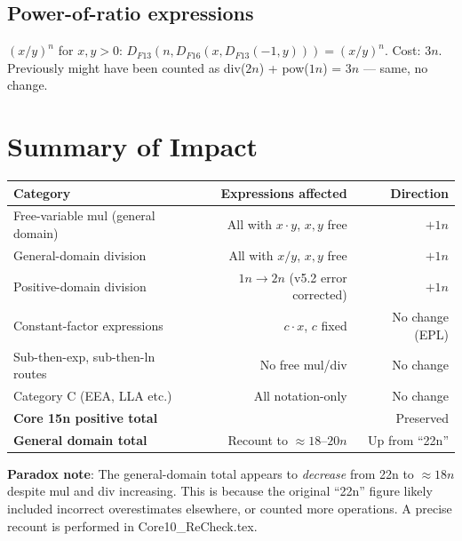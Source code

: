 \documentclass[11pt]{article}
\newcommand{\ok}[1]{\textcolor{correct}{#1}}
\newcommand{\bad}[1]{\textcolor{flagged}{#1}}
\begin{document}
\subsection{Power-of-ratio expressions}

$(x/y)^n$ for $x,y > 0$: $D_{F13}(n, D_{F16}(x, D_{F13}(-1,y))) = (x/y)^n$. Cost: $3n$.
Previously might have been counted as div($2n$) + pow($1n$) = $3n$ --- same, no change.

\section{Summary of Impact}

\begin{center}
\begin{tabular}{lrr}
\toprule
Category & Expressions affected & Direction \\
\midrule
Free-variable mul (general domain) & All with $x \cdot y$, $x,y$ free & $+1n$ \\
General-domain division & All with $x/y$, $x,y$ free & $+1n$ \\
Positive-domain division & $1n \to 2n$ (v5.2 error corrected) & $+1n$ \\
Constant-factor expressions & $c \cdot x$, $c$ fixed & No change (EPL) \\
Sub-then-exp, sub-then-ln routes & No free mul/div & No change \\
Category C (EEA, LLA etc.) & All notation-only & No change \\
\midrule
\textbf{Core 15n positive total} & & \ok{Preserved} \\
\textbf{General domain total} & Recount to $\approx 18$--$20n$ & \bad{Up from ``22n''} \\
\bottomrule
\end{tabular}
\end{center}

\noindent\textbf{Paradox note}: The general-domain total appears to \emph{decrease} from 22n to
$\approx 18n$ despite mul and div increasing. This is because the original ``22n'' figure likely
included incorrect overestimates elsewhere, or counted more operations. A precise recount
is performed in Core10\_ReCheck.tex.
\end{document}
